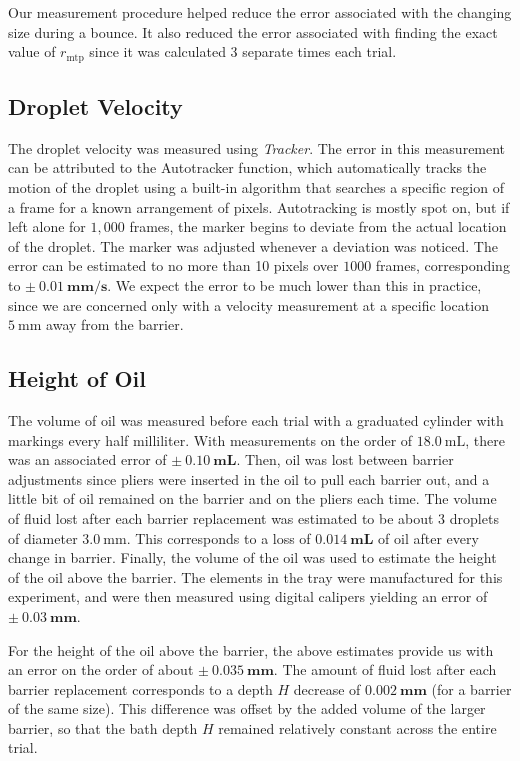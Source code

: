 Our measurement procedure helped reduce the error associated with the changing size during a bounce. It also reduced the error associated with finding the exact value of $r_\mathrm{mtp}$ since it was calculated 3 separate times each trial.

    \subsection{Droplet Velocity}
The droplet velocity was measured using \textit{Tracker}. The error in this measurement can be attributed to the Autotracker function, which automatically tracks the motion of the droplet using a built-in algorithm that searches a specific region of a frame for a known arrangement of pixels. Autotracking is mostly spot on, but if left alone for $1,000$ frames, the marker begins to deviate from the actual location of the droplet. The marker was adjusted whenever a deviation was noticed. The error can be estimated to no more than 10 pixels over $1000$ frames, corresponding to $\mathbf{\pm~0.01~\mathrm{\textbf{mm/s}}}$. We expect the error to be much lower than this in practice, since we are concerned only with a velocity measurement at a specific location $5~\mathrm{mm}$ away from the barrier.

    \subsection{Height of Oil}
The volume of oil was measured before each trial with a graduated cylinder with markings every half milliliter. With measurements on the order of $18.0~\mathrm{mL}$, there was an associated error of $\mathbf{\pm~0.10~\mathrm{\textbf{mL}}}$. Then, oil was lost between barrier adjustments since pliers were inserted in the oil to pull each barrier out, and a little bit of oil remained on the barrier and on the pliers each time. The volume of fluid lost after each barrier replacement was estimated to be about 3 droplets of diameter $3.0~\mathrm{mm}$. This corresponds to a loss of $\mathbf{0.014~\mathrm{\textbf{mL}}}$ of oil after every change in barrier. Finally, the volume of the oil was used to estimate the height of the oil above the barrier. The elements in the tray were manufactured for this experiment, and were then measured using digital calipers yielding an error of $\mathbf{\pm~0.03~\mathrm{\textbf{mm}}}$. 

For the height of the oil above the barrier, the above estimates provide us with an error on the order of about $\mathbf{\pm~0.035~\mathrm{\textbf{mm}}}$. The amount of fluid lost after each barrier replacement corresponds to a depth $H$ decrease of $\mathbf{0.002~\mathrm{\textbf{mm}}}$ (for a barrier of the same size). This difference was offset by the added volume of the larger barrier, so that the bath depth $H$ remained relatively constant across the entire trial. 

